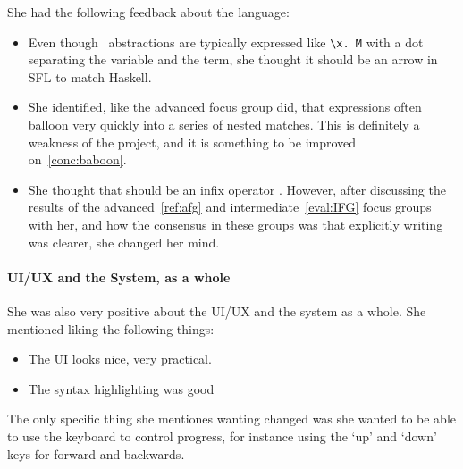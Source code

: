 \noindent She had the following feedback about the language:

\begin{itemize}
    \item Even though \lcalc\ abstractions are typically expressed like \verb|\x. M| with a dot separating the variable and the term, she thought it should be an arrow in \ac{SFL} to match Haskell.
    \item She identified, like the advanced focus group did, that expressions often balloon very quickly into a series of nested matches. This is definitely a weakness of the project, and it is something to be improved on~\ref{conc:baboon}.
    \item She thought that  should be an infix operator \sflinline{:}. However, after discussing the results of the advanced~\ref{ref:afg} and intermediate~\ref{eval:IFG} focus groups with her, and how the consensus in these groups was that explicitly writing  was clearer, she changed her mind. 
\end{itemize}

\paragraph{UI/UX and the System, as a whole}
She was also very positive about the UI/UX and the system as a whole. She mentioned liking the following things:

\begin{itemize}
    \item The UI looks nice, very practical.
    \item The syntax highlighting was good
\end{itemize}

The only specific thing she mentiones wanting changed was she wanted to be able to use the keyboard to control progress, for instance using the `up' and `down' keys for forward and backwards.





